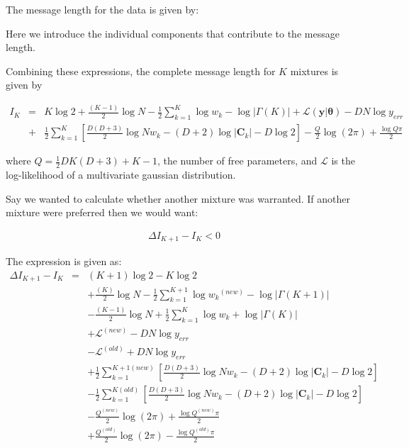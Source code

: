 \documentclass{elsarticle}
\newcommand{\vect}[1]{\boldsymbol{\mathbf{#1}}}
\def\veccov{\vect{C}}
\def\vectheta{\vect{\theta}}
\def\datum{y}
\def\data{\vect{\datum}}
\begin{document}
The message length for the data is given by:

Here we introduce the individual components that contribute to the message length.

Combining these expressions, the complete message length for $K$ mixtures is given by

\begin{eqnarray}
I_K & = & K\log{2} %
    + \frac{(K - 1)}{2}\log{N} - \frac{1}{2}\sum_{k=1}^{K}\log{w_k} - \log{|\Gamma(K)|} %
    + \mathcal{L}(\data|\vectheta) - DN\log{y_{err}} \\ %
  & + & \frac{1}{2}\sum_{k=1}^{K}\left[\frac{D(D+3)}{2}\log{{Nw_k}} - (D + 2)\log{|\veccov_k|} - D\log{2}\right] %
    - \frac{Q}{2}\log(2\pi) + \frac{\log{Q\pi}}{2} %
\end{eqnarray}

\noindent{}where $Q = \frac{1}{2}DK(D + 3) + K - 1$, the number of free parameters, and
$\mathcal{L}$ is the log-likelihood of a multivariate gaussian distribution.

Say we wanted to calculate whether another mixture was warranted. If another
mixture were preferred then we would want:

\begin{eqnarray}
  \Delta{}I_{K+1} - I_{K} < 0
\end{eqnarray}

The expression is given as:
\begin{eqnarray}
\Delta{I_{K+1} - I_K} & = & (K + 1)\log{2} - K\log{2} \\ %
  &&+ \frac{(K)}{2}\log{N} - \frac{1}{2}\sum_{k=1}^{K+1}\log{w_k}^{(new)} - \log{|\Gamma(K+1)|} \\ %
  &&- \frac{(K - 1)}{2}\log{N} + \frac{1}{2}\sum_{k=1}^{K}\log{w_k} + \log{|\Gamma(K)|}\\ %
  &&+ \mathcal{L}^{(new)} - DN\log{y_{err}} \\ %
  &&- \mathcal{L}^{(old)} + DN\log{y_{err}} \\ %
  &&+ \frac{1}{2}\sum_{k=1}^{K+1(new)}\left[\frac{D(D+3)}{2}\log{{Nw_k}} - (D + 2)\log{|\veccov_k|} - D\log{2}\right] \\ %
  &&- \frac{1}{2}\sum_{k=1}^{K(old)}\left[\frac{D(D+3)}{2}\log{{Nw_k}} - (D + 2)\log{|\veccov_k|} - D\log{2}\right] \\ %
  &&- \frac{Q^{(new)}}{2}\log(2\pi) + \frac{\log{Q^{(new)}\pi}}{2} \\ %
  &&+ \frac{Q^{(old)}}{2}\log(2\pi) - \frac{\log{Q^{(old)}\pi}}{2} %
\end{eqnarray}
\end{document}
